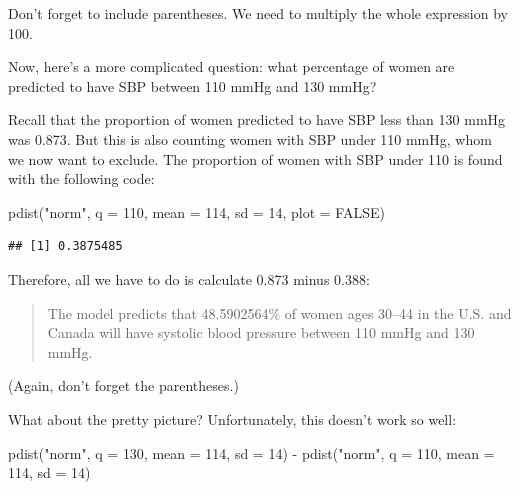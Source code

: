 \documentclass[
]{book}
\newenvironment{Shaded}{\begin{snugshade}}{\end{snugshade}}
\newcommand{\AttributeTok}[1]{\textcolor[rgb]{0.77,0.63,0.00}{#1}}
\newcommand{\ConstantTok}[1]{\textcolor[rgb]{0.00,0.00,0.00}{#1}}
\newcommand{\DecValTok}[1]{\textcolor[rgb]{0.00,0.00,0.81}{#1}}
\newcommand{\FunctionTok}[1]{\textcolor[rgb]{0.00,0.00,0.00}{#1}}
\newcommand{\NormalTok}[1]{#1}
\newcommand{\SpecialCharTok}[1]{\textcolor[rgb]{0.00,0.00,0.00}{#1}}
\newcommand{\StringTok}[1]{\textcolor[rgb]{0.31,0.60,0.02}{#1}}
\begin{document}
Don't forget to include parentheses. We need to multiply the whole expression by 100.

Now, here's a more complicated question: what percentage of women are predicted to have SBP between 110 mmHg and 130 mmHg?

Recall that the proportion of women predicted to have SBP less than 130 mmHg was 0.873. But this is also counting women with SBP under 110 mmHg, whom we now want to exclude. The proportion of women with SBP under 110 is found with the following code:

\begin{Shaded}
\begin{Highlighting}[]
\FunctionTok{pdist}\NormalTok{(}\StringTok{"norm"}\NormalTok{, }\AttributeTok{q =} \DecValTok{110}\NormalTok{, }\AttributeTok{mean =} \DecValTok{114}\NormalTok{, }\AttributeTok{sd =} \DecValTok{14}\NormalTok{, }\AttributeTok{plot =} \ConstantTok{FALSE}\NormalTok{)}
\end{Highlighting}
\end{Shaded}

\begin{verbatim}
## [1] 0.3875485
\end{verbatim}

Therefore, all we have to do is calculate 0.873 minus 0.388:

\begin{quote}
The model predicts that 48.5902564\% of women ages 30--44 in the U.S. and Canada will have systolic blood pressure between 110 mmHg and 130 mmHg.
\end{quote}

(Again, don't forget the parentheses.)

What about the pretty picture? Unfortunately, this doesn't work so well:

\begin{Shaded}
\begin{Highlighting}[]
\FunctionTok{pdist}\NormalTok{(}\StringTok{"norm"}\NormalTok{, }\AttributeTok{q =} \DecValTok{130}\NormalTok{, }\AttributeTok{mean =} \DecValTok{114}\NormalTok{, }\AttributeTok{sd =} \DecValTok{14}\NormalTok{) }\SpecialCharTok{{-}} 
    \FunctionTok{pdist}\NormalTok{(}\StringTok{"norm"}\NormalTok{, }\AttributeTok{q =} \DecValTok{110}\NormalTok{, }\AttributeTok{mean =} \DecValTok{114}\NormalTok{, }\AttributeTok{sd =} \DecValTok{14}\NormalTok{)}
\end{Highlighting}
\end{Shaded}
\end{document}
